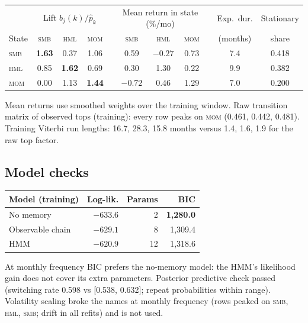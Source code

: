 \documentclass[11pt]{article}
\newcommand{\SMB}{\textsc{smb}}
\newcommand{\HML}{\textsc{hml}}
\newcommand{\MOM}{\textsc{mom}}
\begin{document}
\begin{center}
\begin{tabular}{l ccc c ccc c c c}
\toprule
 & \multicolumn{3}{c}{Lift $b_j(k)/\hat p_k$} && \multicolumn{3}{c}{Mean return in state (\%/mo)} && Exp.\ dur. & Stationary \\
\cmidrule{2-4}\cmidrule{6-8}
State & \SMB & \HML & \MOM && \SMB & \HML & \MOM && (months) & share \\
\midrule
\SMB & \textbf{1.63} & 0.37 & 1.06 && 0.59 & $-0.27$ & 0.73 && 7.4 & 0.418 \\
\HML & 0.85 & \textbf{1.62} & 0.69 && 0.30 & 1.30 & 0.22 && 9.9 & 0.382 \\
\MOM & 0.00 & 1.13 & \textbf{1.44} && $-0.72$ & 0.46 & 1.29 && 7.0 & 0.200 \\
\bottomrule
\end{tabular}
\end{center}
Mean returns use smoothed weights over the training window. Raw transition matrix of observed tops (training): every row peaks on \MOM{} (0.461, 0.442, 0.481). Training Viterbi run lengths: 16.7, 28.3, 15.8 months versus 1.4, 1.6, 1.9 for the raw top factor.

\subsection{Model checks}
\begin{center}
\begin{tabular}{lrrr}
\toprule
Model (training) & Log-lik. & Params & BIC \\
\midrule
No memory & $-633.6$ & 2 & \textbf{1{,}280.0} \\
Observable chain & $-629.1$ & 8 & 1{,}309.4 \\
HMM & $-620.9$ & 12 & 1{,}318.6 \\
\bottomrule
\end{tabular}
\end{center}
At monthly frequency BIC prefers the no-memory model: the HMM's likelihood gain does not cover its extra parameters. Posterior predictive check passed (switching rate 0.598 vs [0.538, 0.632]; repeat probabilities within range). Volatility scaling broke the names at monthly frequency (rows peaked on \SMB, \HML, \SMB; drift in all refits) and is not used.
\end{document}

